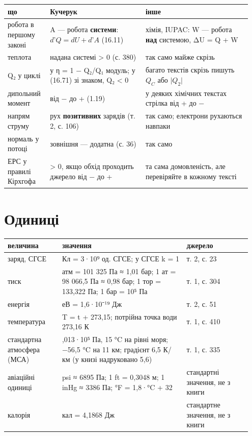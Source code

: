 \documentclass[11pt,a4paper,oneside]{book}
\begin{document}
{\small
\begin{longtable}{>{\raggedright\arraybackslash}p{0.167\linewidth}>{\raggedright\arraybackslash}p{0.371\linewidth}>{\raggedright\arraybackslash}p{0.414\linewidth}}
\toprule
\textbf{що} & \textbf{Кучерук} & \textbf{інше} \\
\midrule
\endhead
робота в першому законі & A — робота \textbf{системи}: $d\text{'}Q = dU + d\text{'}A$ (16.11) & хімія, IUPAC: W — робота \textbf{над} системою, ΔU = Q + W \\
теплота & надана системі > 0 (с. 380) & так само майже скрізь \\
Q₂ у циклі & у η = 1 − Q₂/Q₁ модуль; у (16.71) зі знаком, Q₂ < 0 & багато текстів скрізь пишуть $Q_C$ або $\lvert Q_2\rvert$ \\
дипольний момент & від − до + (1.19) & у деяких хімічних текстах стрілка від + до − \\
напрям струму & рух \textbf{позитивних} зарядів (т. 2, с. 106) & так само; електрони рухаються навпаки \\
нормаль у потоці & зовнішня — додатна (с. 36) & так само \\
ЕРС у правилі Кірхгофа & > 0, якщо обхід проходить джерело від − до + & та сама домовленість, але перевіряйте в кожному тексті \\
\bottomrule
\end{longtable}
}

\section*{Одиниці}

{\small
\begin{longtable}{>{\raggedright\arraybackslash}p{0.212\linewidth}>{\raggedright\arraybackslash}p{0.488\linewidth}>{\raggedright\arraybackslash}p{0.252\linewidth}}
\toprule
\textbf{величина} & \textbf{значення} & \textbf{джерело} \\
\midrule
\endhead
заряд, СГСЕ & 1 Кл = 3·10⁹ од. СГСЕ; у СГСЕ k = 1 & т. 2, с. 23 \\
тиск & 1 атм = 101 325 Па ≈ 1,01 бар; 1 ат = 98 066,5 Па ≈ 0,98 бар; 1 тор = 133,322 Па; 1 бар = 10⁵ Па & т. 1, с. 304 \\
енергія & 1 еВ = 1,6·10⁻¹⁹ Дж & т. 2, с. 51 \\
температура & T = t + 273,15; потрійна точка води 273,16 К & т. 1, с. 410 \\
стандартна атмосфера (МСА) & 1,013·10⁵ Па, 15 °C на рівні моря; −56,5 °C на 11 км; градієнт 6,5 К/км (у книзі надруковано 5,6) & т. 1, с. 335 \\
авіаційні одиниці & 1 psi ≈ 6895 Па; 1 ft = 0,3048 м; 1 inHg ≈ 3386 Па; °F = 1,8·°C + 32 & стандартні значення, не з книги \\
калорія & 1 кал = 4,1868 Дж & стандартне значення, не з книги \\
\bottomrule
\end{longtable}
}
\end{document}
